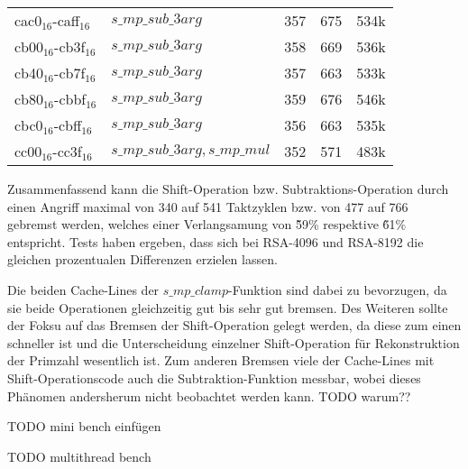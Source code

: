 \begin{table}[h]
\begin{tabular}{lllll}
cac0$_{16}$-caff$_{16}$  & $s\_mp\_sub\_3arg$             & 357   & 675         & 534k    \\
cb00$_{16}$-cb3f$_{16}$  & $s\_mp\_sub\_3arg$            & 358   & 669         & 536k    \\
cb40$_{16}$-cb7f$_{16}$  & $s\_mp\_sub\_3arg$             & 357   & 663         & 533k    \\
cb80$_{16}$-cbbf$_{16}$  & $s\_mp\_sub\_3arg$             & 359   & 676         & 546k    \\
cbc0$_{16}$-cbff$_{16}$  & $s\_mp\_sub\_3arg$             & 356   & 663         & 535k    \\
cc00$_{16}$-cc3f$_{16}$  & $s\_mp\_sub\_3arg, s\_mp\_mul$ & 352   & 571         & 483k   
\end{tabular}
\end{table}


Zusammenfassend kann die Shift-Operation bzw. Subtraktions-Operation durch einen Angriff maximal von 340 auf 541 Taktzyklen bzw. von 477 auf 766 gebremst werden, welches einer Verlangsamung von \~59\% respektive \~61\% entspricht.
Tests haben ergeben, dass sich bei RSA-4096 und RSA-8192 die gleichen prozentualen Differenzen erzielen lassen.

Die beiden Cache-Lines der $s\_mp\_clamp$-Funktion sind dabei zu bevorzugen, da sie beide Operationen gleichzeitig gut bis sehr gut bremsen.
Des Weiteren sollte der Foksu auf das Bremsen der Shift-Operation gelegt werden, da diese zum einen schneller ist und die Unterscheidung einzelner Shift-Operation für Rekonstruktion der Primzahl wesentlich ist.
Zum anderen Bremsen viele der Cache-Lines mit Shift-Operationscode auch die Subtraktion-Funktion messbar, wobei dieses Phänomen andersherum nicht beobachtet werden kann.
TODO warum??

TODO mini bench einfügen

TODO multithread bench




